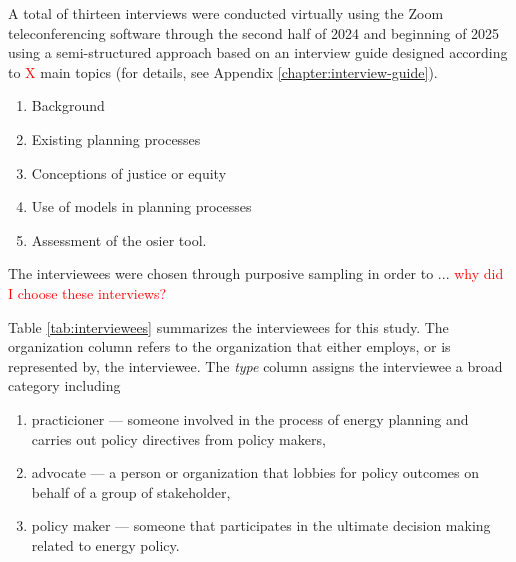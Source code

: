 A total of thirteen interviews were conducted virtually using the Zoom
teleconferencing software through the second half of 2024 and beginning of 2025
using a semi-structured approach based on an interview guide designed according
to \textcolor{red}{X} main topics (for details, see Appendix
\ref{chapter:interview-guide}).
\begin{enumerate}
    \item Background
    \item Existing planning processes
    \item Conceptions of justice or equity
    \item Use of models in planning processes
    \item Assessment of the \ac{osier} tool.
\end{enumerate}
The interviewees were chosen through purposive sampling in order to ... 
\textcolor{red}{why did I choose these interviews?}

Table \ref{tab:interviewees} summarizes the interviewees for this study. The
organization column refers to the organization that either employs, or is
represented by, the interviewee. The \textit{type} column assigns the
interviewee a broad category including
\begin{enumerate}
    \item practicioner --- someone involved in the process of energy planning
    and carries out policy directives from policy makers,
    \item advocate --- a person or organization that lobbies for policy outcomes
    on behalf of a group of stakeholder,
    \item policy maker --- someone that participates in the ultimate decision
    making related to energy policy.
\end{enumerate}
    
